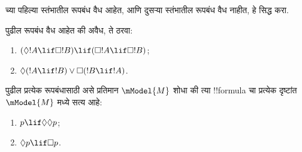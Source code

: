 \documentclass[../../../include/open-logic-section]{subfiles}
\begin{document}
\begin{prob}%
   च्या
  पहिल्या स्तंभातील रूपबंध वैध आहेत, आणि दुसऱ्या
  स्तंभातील रूपबंध वैध नाहीत, हे सिद्ध करा.
\end{prob}

\begin{prob}
  पुढील रूपबंध वैध आहेत की अवैध, ते ठरवा:
  \begin{enumerate}
  \item $(\Diamond !A \lif \Box !B) \lif (\Box !A \lif \Box
    !B)$;
  \item $\Diamond(!A \lif !B) \lor \Box(!B \lif !A)$.
  \end{enumerate}
\end{prob}

\begin{prob}
  पुढील प्रत्येक रूपबंधासाठी असे प्रतिमान $\mModel{M}$ शोधा की
  त्या !!{formula} चा प्रत्येक दृष्टांत $\mModel{M}$ मध्ये सत्य आहे:
  \begin{enumerate}
  \item $p \lif \Diamond\Diamond p$;
  \item $\Diamond p \lif \Box p$.
  \end{enumerate}
\end{prob}
\end{document}
